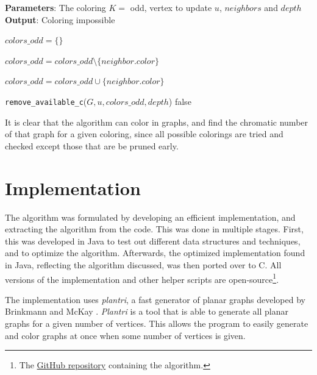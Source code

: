 \documentclass{article}
\begin{document}
\begin{algorithm}[tb]
	\caption{\texttt{handle\_special\_case\_odd}}
	\label{alg:special}
	\textbf{Parameters}: The coloring $K = $ odd, vertex to update $u$, $neighbors$ and $depth$ \\
	\textbf{Output}: Coloring impossible
	\begin{algorithmic}[1]
		\STATE $colors\_odd = \{\}$
		
		
		\STATE $colors\_odd = colors\_odd \setminus \{neighbor.color\}$
		
		\ELSE 
		
		\STATE $colors\_odd = colors\_odd \cup \{neighbor.color\}$
		\ENDIF
		
		\ENDFOR
		
		
		\RETURN \texttt{remove\_available\_c}($G, u, colors\_odd, depth$)
		\ENDIF
		\RETURN false
	\end{algorithmic}
\end{algorithm}

It is clear that the algorithm can color in graphs, and find the chromatic number of that graph for a given coloring, since all possible colorings are tried and checked except those that are be pruned early.

\section{Implementation}
\label{sec:implementation}

The algorithm was formulated by developing an efficient implementation, and extracting the algorithm from the code. This was done in multiple stages. First, this was developed in Java to test out different data structures and techniques, and to optimize the algorithm. Afterwards, the optimized implementation found in Java, reflecting the algorithm discussed, was then ported over to C. All versions of the implementation and other helper scripts are open-source\footnote{The \href{https://github.com/ArneClaerhout/color_planar_graphs}{GitHub repository} containing the algorithm.}.

The implementation uses \textit{plantri}, a fast generator of planar graphs developed by Brinkmann and McKay \cite{brinkmann2007fast}. \textit{Plantri} is a tool that is able to generate all planar graphs for a given number of vertices. This allows the program to easily generate and color graphs at once when some number of vertices is given. 
\end{document}
